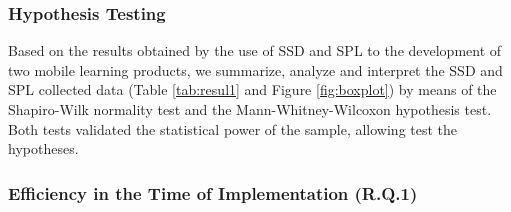 \subsubsection*{Hypothesis Testing}

Based on the results obtained by the use of SSD and SPL to the development of two mobile learning products, we summarize, analyze and interpret the SSD and SPL collected data (Table \ref{tab:resul1} and Figure \ref{fig:boxplot}) by means of the Shapiro-Wilk normality test and the Mann-Whitney-Wilcoxon hypothesis test. Both tests validated the statistical power of the sample, allowing test the hypotheses.

\subsubsection*{Efficiency in the Time of Implementation (R.Q.1)}

